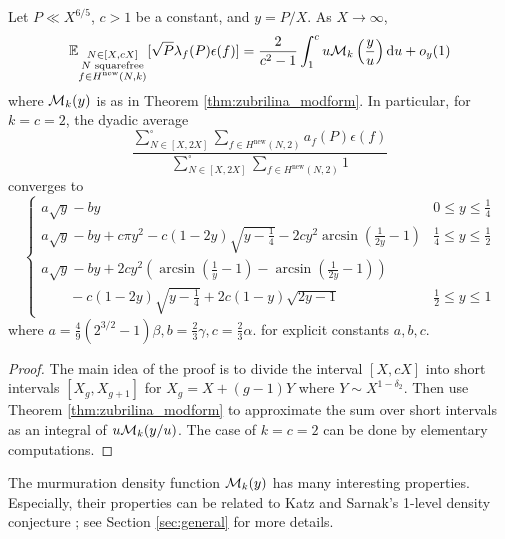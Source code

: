 \begin{theorem}
    \label{thm:zubrilina_geom}
    Let $P \ll X^{6/5}$, $c > 1$ be a constant, and $y = P / X$. As $X \to \infty$,
    \begin{equation*}
        \mathbb{E}_{\substack{N \in [X, cX] \\ N \text{ squarefree} \\ f \in H^{\text{new}}(N, k)}} [\sqrt{P} \lambda_f(P) \epsilon(f)] = \frac{2}{c^2 - 1} \int_1^c u \mathcal{M}_{k}\left(\frac{y}{u} \right) \mathrm{d} u + o_y(1)
    \end{equation*}
    where $\mathcal{M}_k(y)$ is as in Theorem \ref{thm:zubrilina_modform}.
    In particular, for $k = c = 2$, the dyadic average
    \begin{equation*}
        \frac{\sum_{N \in [X, 2X]}^{\square} \sum_{f \in H^{\text{new}}(N, 2)} a_f(P) \epsilon(f)}{\sum_{N \in [X, 2X]}^{\square} \sum_{f \in H^{\text{new}}(N, 2)} 1}
    \end{equation*}
    converges to
    \begin{equation*}
        \begin{cases}
            a \sqrt{y} - b y & 0 \le y \le \frac{1}{4} \\
            a\sqrt{y} - by + c \pi y^2 - c (1 - 2y) \sqrt{y - \frac{1}{4}} - 2 c y^2 \arcsin\left(\frac{1}{2y} - 1\right)& \frac{1}{4} \le y \le \frac{1}{2} \\
            a \sqrt{y} - by + 2cy^2 \left(\arcsin\left(\frac{1}{y} - 1\right) - \arcsin\left(\frac{1}{2y} - 1 \right)\right) & \\
            \quad\quad -c(1 - 2y) \sqrt{y - \frac{1}{4}} + 2c (1 - y) \sqrt{2y - 1} & \frac{1}{2} \le y \le 1
        \end{cases}
    \end{equation*}
    where $a = \frac{4}{9}(2^{3/2} - 1)\beta, b = \frac{2}{3}\gamma, c = \frac{2}{3}\alpha$.
    for explicit constants $a, b, c$.
\end{theorem}
\begin{proof}
    The main idea of the proof is to divide the interval $[X, cX]$ into short intervals $[X_g, X_{g+1}]$ for $X_g = X + (g - 1)Y$ where $Y \sim X^{1 - \delta_2}$.
    Then use Theorem \ref{thm:zubrilina_modform} to approximate the sum over short intervals as an integral of $u \mathcal{M}_k(y/u)$.
    The case of $k = c = 2$ can be done by elementary computations.
\end{proof}

The murmuration density function $\mathcal{M}_k(y)$ has many interesting properties.
Especially, their properties can be related to Katz and Sarnak's 1-level density conjecture \cite{katz1999zeroes}; see Section \ref{sec:general} for more details.

